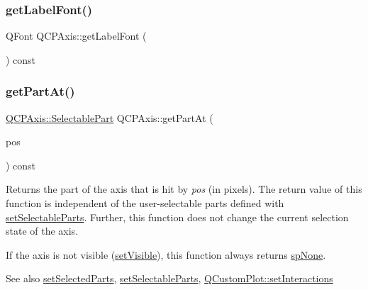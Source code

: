 \mbox{\label{class_q_c_p_axis_aeac21c907d2516af9cde9a463043d671}} 
\subsubsection{\texorpdfstring{getLabelFont()}{getLabelFont()}}
{\footnotesize\ttfamily Q\+Font Q\+C\+P\+Axis\+::get\+Label\+Font (\begin{DoxyParamCaption}{ }\end{DoxyParamCaption}) const\hspace{0.3cm}{\ttfamily [protected]}}

\mbox{\label{class_q_c_p_axis_a22ab2d71d7341b9b3974c0dd10619af2}} 
\subsubsection{\texorpdfstring{getPartAt()}{getPartAt()}}
{\footnotesize\ttfamily \mbox{\hyperlink{class_q_c_p_axis_abee4c7a54c468b1385dfce2c898b115f}{Q\+C\+P\+Axis\+::\+Selectable\+Part}} Q\+C\+P\+Axis\+::get\+Part\+At (\begin{DoxyParamCaption}\item[{const Q\+PointF \&}]{pos }\end{DoxyParamCaption}) const}

Returns the part of the axis that is hit by {\itshape pos} (in pixels). The return value of this function is independent of the user-\/selectable parts defined with \mbox{\hyperlink{class_q_c_p_axis_a513f9b9e326c505d9bec54880031b085}{set\+Selectable\+Parts}}. Further, this function does not change the current selection state of the axis.

If the axis is not visible (\mbox{\hyperlink{class_q_c_p_layerable_a3bed99ddc396b48ce3ebfdc0418744f8}{set\+Visible}}), this function always returns \mbox{\hyperlink{class_q_c_p_axis_abee4c7a54c468b1385dfce2c898b115fae0df8123a5528d5ccf87cb7794f971ea}{sp\+None}}.

\begin{DoxySeeAlso}{See also}
\mbox{\hyperlink{class_q_c_p_axis_ab9d7a69277dcbed9119b3c1f25ca19c3}{set\+Selected\+Parts}}, \mbox{\hyperlink{class_q_c_p_axis_a513f9b9e326c505d9bec54880031b085}{set\+Selectable\+Parts}}, \mbox{\hyperlink{class_q_custom_plot_a5ee1e2f6ae27419deca53e75907c27e5}{Q\+Custom\+Plot\+::set\+Interactions}} 
\end{DoxySeeAlso}
\mbox{\label{class_q_c_p_axis_aad7739c229b292ddab0b3a43a5676f54}} 
